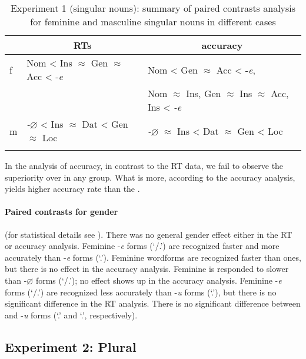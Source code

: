 \documentclass[output=paper, modfonts,newtxmath,hidelinks]{langscibook}
\begin{document}
\begin{table}
	\caption{Experiment 1 (singular nouns): summary of paired contrasts analysis for feminine and masculine singular nouns in different cases}
    \label{tab:caseSgHierarchy}
    \begin{tabular}{*{3}l}
    \lsptoprule
    ~	&	\multicolumn{1}{c}{RTs}	&	\multicolumn{1}{c}{accuracy}\\
    \midrule
    f	&	Nom < Ins $\approx$ Gen $\approx$ Acc < -\textit{e}	&	Nom < Gen $\approx$ Acc < -\textit{e}, \\
    ~	&	~	&	Nom $\approx$ Ins, Gen $\approx$ Ins $\approx$ Acc, Ins < \textit{-e}\\
    m	&	\textit{-$\varnothing$} < Ins $\approx$ Dat < Gen $\approx$ Loc	&	\textit{-$\varnothing$} $\approx$ Ins < Dat $\approx$ Gen  < Loc			\\
    \lspbottomrule
    \end{tabular}
\end{table}

In the analysis of accuracy, in contrast to the RT data, we fail to observe the  superiority over  in any  group. What is more, according to the accuracy analysis,   yields higher accuracy rate than the  . 

\paragraph*{Paired contrasts for gender} (for statistical details see ). There was no general gender effect either in the RT or accuracy analysis. Feminine -\textit{e} forms (`\datt/\locc.\fem') are recognized faster and more accurately than  -\textit{e} forms (`\locc.\masc'). Feminine  wordforms are recognized faster than  ones, but there is no effect in the accuracy analysis. Feminine  is responded to slower than  -$\varnothing$ forms (`\nomm/\accc.\masc'); no effect shows up in the accuracy analysis. Feminine -\textit{e} forms (`\datt/\locc.\fem') are recognized less accurately than  -\textit{u}  forms (`\datt.\masc'), but there is no significant difference in the RT analysis. There is no significant difference between  and  -\textit{u} forms (`\accc.\fem' and `\datt.\masc', respectively).

\subsection{Experiment 2: Plural}
\end{document}
